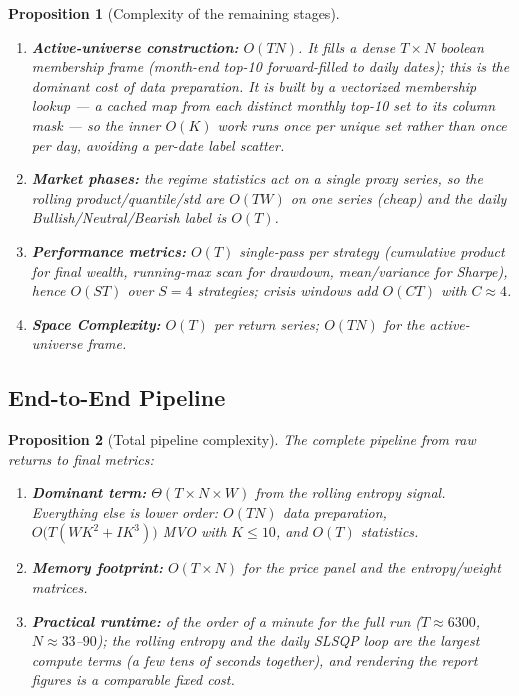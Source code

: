 \documentclass[a4paper,12pt]{article}
\newtheorem{proposition}{Proposition}[section]
\begin{document}
\begin{proposition}[Complexity of the remaining stages]
\begin{enumerate}[label=(\roman*)]
    \item \textbf{Active-universe construction:} $O(T N)$. It fills a dense $T\times N$ boolean membership frame (month-end top-10 forward-filled to daily dates); this is the dominant cost of data preparation. It is built by a vectorized membership lookup --- a cached map from each distinct monthly top-10 set to its column mask --- so the inner $O(K)$ work runs once per unique set rather than once per day, avoiding a per-date label scatter.
    \item \textbf{Market phases:} the regime statistics act on a \emph{single} proxy series, so the rolling product/quantile/std are $O(T W)$ on one series (cheap) and the daily Bullish/Neutral/Bearish label is $O(T)$.
    \item \textbf{Performance metrics:} $O(T)$ single-pass per strategy (cumulative product for final wealth, running-max scan for drawdown, mean/variance for Sharpe), hence $O(ST)$ over $S=4$ strategies; crisis windows add $O(CT)$ with $C\approx 4$.
    \item \textbf{Space Complexity:} $O(T)$ per return series; $O(TN)$ for the active-universe frame.
\end{enumerate}
\end{proposition}

\subsection{End-to-End Pipeline}

\begin{proposition}[Total pipeline complexity]
The complete pipeline from raw returns to final metrics:
\begin{enumerate}[label=(\roman*)]
    \item \textbf{Dominant term:} $\Theta(T \times N \times W)$ from the rolling entropy signal. Everything else is lower order: $O(TN)$ data preparation, $O\!\big(T(WK^2+IK^3)\big)$ MVO with $K\le 10$, and $O(T)$ statistics.
    \item \textbf{Memory footprint:} $O(T \times N)$ for the price panel and the entropy/weight matrices.
    \item \textbf{Practical runtime:} of the order of a minute for the full run ($T\approx 6300$, $N\approx 33$--$90$); the rolling entropy and the daily SLSQP loop are the largest compute terms (a few tens of seconds together), and rendering the report figures is a comparable fixed cost.
\end{enumerate}
\end{proposition}
\end{document}
